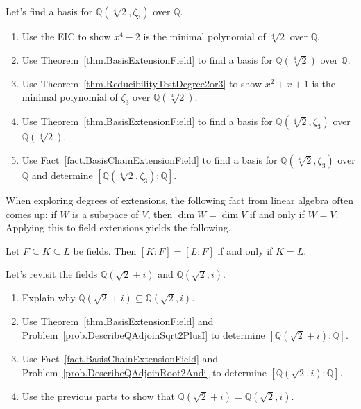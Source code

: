 \begin{problem}\label{prob.BasisQFourthRoot2AndZeta3}
Let's find a basis for $\mathbb{Q}(\sqrt[4]{2},\zeta_3)$ over $\mathbb{Q}$.
\begin{enumerate}
\item Use the EIC to show $x^4-2$ is the minimal polynomial of $\sqrt[4]{2}$ over $\mathbb{Q}$.
\item Use Theorem~\ref{thm.BasisExtensionField} to find a basis for  $\mathbb{Q}(\sqrt[4]{2})$ over $\mathbb{Q}$.
\item Use Theorem~\ref{thm.ReducibilityTestDegree2or3} to show $x^2+x+1$ is the minimal polynomial of $\zeta_3$ over $\mathbb{Q}(\sqrt[4]{2})$.
\item Use Theorem~\ref{thm.BasisExtensionField} to find a basis for  $\mathbb{Q}(\sqrt[4]{2},\zeta_3)$ over $\mathbb{Q}(\sqrt[4]{2})$.
\item Use Fact~\ref{fact.BasisChainExtensionField} to find a basis for $\mathbb{Q}(\sqrt[4]{2},\zeta_3)$ over $\mathbb{Q}$ and determine $[\mathbb{Q}(\sqrt[4]{2},\zeta_3):\mathbb{Q}]$.
\end{enumerate}
\end{problem}

When exploring degrees of extensions, the following fact from linear algebra often comes up: if $W$ is a subspace of $V$, then $\dim W = \dim V$ if and only if $W = V$. Applying this to field extensions yields the following.

\begin{fact}
Let $F\subseteq K \subseteq L$ be fields. Then $[K:F] = [L:F]$ if and only if $K = L$.
\end{fact}

\begin{problem}
Let's revisit the fields $\mathbb{Q}(\sqrt{2}+i)$ and $\mathbb{Q}(\sqrt{2},i)$.
\begin{enumerate}
\item Explain why $\mathbb{Q}(\sqrt{2}+i)\subseteq \mathbb{Q}(\sqrt{2},i)$.
\item Use Theorem~\ref{thm.BasisExtensionField} and Problem~\ref{prob.DescribeQAdjoinSqrt2PlusI} to determine $[\mathbb{Q}(\sqrt{2}+i):\mathbb{Q}]$.
\item Use Fact~\ref{fact.BasisChainExtensionField} and Problem~\ref{prob.DescribeQAdjoinRoot2Andi} to determine $[\mathbb{Q}(\sqrt{2},i):\mathbb{Q}]$.
\item Use the previous parts to show that $\mathbb{Q}(\sqrt{2}+i)= \mathbb{Q}(\sqrt{2},i)$.
\end{enumerate}
\end{problem}

